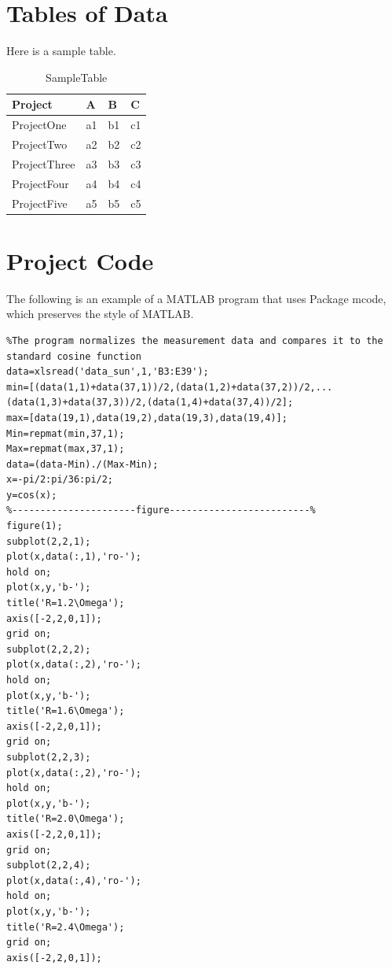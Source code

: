 \documentclass[a4paper,12pt]{article}
\begin{document}
\lstset{breaklines}                %
\lstset{extendedchars=false}
\lstset{language=Matlab}
\appendix
\begin{appendix}
	
	
\section{Tables of Data}
Here is a sample table.
{
	\begin{table}[htb]
		\begin{center}
			\caption{SampleTable}\label{sampeltable}
			\begin{tabular}{m{3cm} m{2cm} m{2cm} m{2cm}}
				\hline
				Project & A & B & C\\
				\hline
				ProjectOne   & a1 & b1 & c1 \\
				ProjectTwo   & a2 & b2 & c2 \\
				ProjectThree & a3 & b3 & c3 \\
				ProjectFour  & a4 & b4 & c4 \\
				ProjectFive  & a5 & b5 & c5 \\
				\hline
			\end{tabular}
		\end{center}
\end{table}}

\newpage
\section{Project Code}

\begin{spacing}{1.5}
The following is an example of a MATLAB program that uses Package mcode, which preserves the style of MATLAB.
\begin{lstlisting}
%The program normalizes the measurement data and compares it to the standard cosine function
data=xlsread('data_sun',1,'B3:E39');
min=[(data(1,1)+data(37,1))/2,(data(1,2)+data(37,2))/2,...
(data(1,3)+data(37,3))/2,(data(1,4)+data(37,4))/2];
max=[data(19,1),data(19,2),data(19,3),data(19,4)];
Min=repmat(min,37,1);
Max=repmat(max,37,1);
data=(data-Min)./(Max-Min);
x=-pi/2:pi/36:pi/2;
y=cos(x);
%----------------------figure-------------------------%
figure(1);
subplot(2,2,1);
plot(x,data(:,1),'ro-');
hold on;
plot(x,y,'b-');
title('R=1.2\Omega');
axis([-2,2,0,1]);
grid on;
subplot(2,2,2);
plot(x,data(:,2),'ro-');
hold on;
plot(x,y,'b-');
title('R=1.6\Omega');
axis([-2,2,0,1]);
grid on;
subplot(2,2,3);
plot(x,data(:,2),'ro-');
hold on;
plot(x,y,'b-');
title('R=2.0\Omega');
axis([-2,2,0,1]);
grid on;
subplot(2,2,4);
plot(x,data(:,4),'ro-');
hold on;
plot(x,y,'b-');
title('R=2.4\Omega');
grid on;
axis([-2,2,0,1]);
\end{lstlisting}
\end{spacing}
\end{appendix}
		
\end{document}
